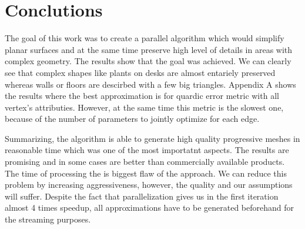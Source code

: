 \chapter{Conclutions}
\thispagestyle{empty}%

The goal of this work was to create a parallel algorithm which would simplify planar surfaces and at the same time preserve high level of details in areas with complex geometry. The results show that the goal was achieved. We can clearly see that complex shapes like plants on desks are almost entariely preserved whereas walls or floors are descirbed with a few big triangles. Appendix A shows the results where the best approximation is for quardic error metric with all vertex's attributies. However, at the same time this metric is the slowest one, because of the number of parameters to jointly optimize for each edge.

Summarizing, the algorithm is able to generate high quality progressive meshes in reasonable time which was one of the most importatnt aspects. The results are promising and in some cases are better than commercially available products. The time of processing the is biggest flaw of the approach. We can reduce this problem by increasing aggressiveness, however, the quality and our assumptions will suffer. Despite the fact that parallelization gives us in the first iteration almost 4 times speedup, all approximations have to be generated beforehand for the streaming purposes.
